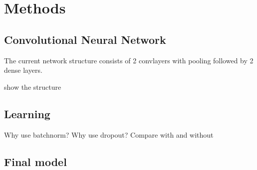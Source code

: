 \documentclass[main.tex]{subfiles}
\begin{document}
\chapter{Methods}
\section{Convolutional Neural Network}
The current network structure consists of 2 convlayers with pooling
followed by 2 dense layers.

show the structure


\section{Learning}
Why use batchnorm?
Why use dropout?
Compare with and without

\section{Final model}
\end{document}
